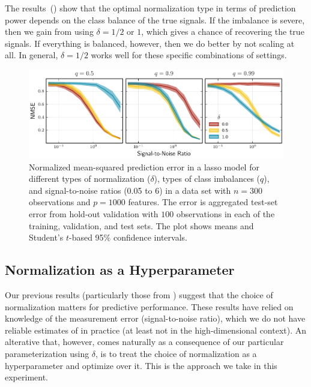 The results~() show that the optimal normalization type in terms of prediction power depends on the class balance of the true signals. If the imbalance is severe, then we gain from using \(\delta=1/2\) or \(1\), which gives a chance of recovering the true signals. If everything is balanced, however, then we do better by not scaling at all. In general, \(\delta=1/2\) works well for these specific combinations of settings.

\begin{figure}[htpb]
  \centering
  \includegraphics[]{plots/binary_data_sim.pdf}
  \caption{%
    Normalized mean-squared prediction error in a lasso model for different types of normalization (\(\delta\)), types of class imbalances (\(q\)), and signal-to-noise ratios (0.05 to 6) in a data set with \(n=300\) observations and \(p = \num{1000}\) features. The error is aggregated test-set error from hold-out validation with \(100\) observations in each of the training, validation, and test sets. The plot shows means and Student's \(t\)-based 95\% confidence intervals.
  }
  \label{fig:binary-sim}
\end{figure}

\subsection{Normalization as a Hyperparameter}\label{sec:experiments-hyperparameter}


Our previous results (particularly those from ) suggest that the choice of normalization matters for predictive performance. These results have relied on knowledge of the measurement error (signal-to-noise ratio), which we do not have reliable estimates of in practice (at least not in the high-dimensional context). An alterative that, however, comes naturally as a consequence of our particular parameterization using \(\delta\), is to treat the choice of normalization as a hyperparameter and optimize over it. This is the approach we take in this experiment.

